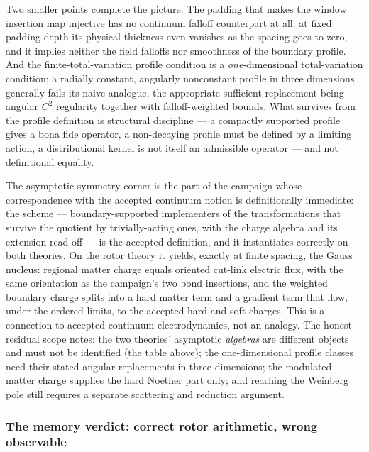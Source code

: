 \noindent Two smaller points complete the picture. The padding that makes the
window insertion map injective has no continuum falloff counterpart at all: at
fixed padding depth its physical thickness even vanishes as the spacing goes to
zero, and it implies neither the field falloffs nor smoothness of the boundary
profile. And the finite-total-variation profile condition is a
\emph{one}-dimensional total-variation condition; a radially constant,
angularly nonconstant profile in three dimensions generally fails its naive
analogue, the appropriate sufficient replacement being angular $C^2$ regularity
together with falloff-weighted bounds. What survives from the profile
definition is structural discipline --- a compactly supported profile gives a
bona fide operator, a non-decaying profile must be defined by a limiting action,
a distributional kernel is not itself an admissible operator --- and not
definitional equality.

\begin{observation}
\label{obs:da-verdict-gauss}
The asymptotic-symmetry corner is the part of the campaign whose
correspondence with the accepted continuum notion is definitionally
immediate: the scheme --- boundary-supported implementers of the
transformations that survive the quotient by trivially-acting ones, with the
charge algebra and its extension read off --- is the accepted definition,
and it instantiates correctly on both theories. On the rotor theory it
yields, exactly at finite spacing, the Gauss nucleus: regional matter charge
equals oriented cut-link electric flux, with the same orientation as the
campaign's two bond insertions, and the weighted boundary charge splits into
a hard matter term and a gradient term that flow, under the ordered limits,
to the accepted hard and soft charges. This is a connection to accepted
continuum electrodynamics, not an analogy. The honest residual scope notes:
the two theories' asymptotic \emph{algebras} are different objects and must
not be identified (the table above); the one-dimensional profile classes need
their stated angular replacements in three dimensions; the modulated matter
charge supplies the hard Noether part only; and reaching the Weinberg pole
still requires a separate scattering and reduction argument.
\end{observation}

\subsubsection*{The memory verdict: correct rotor arithmetic, wrong observable}

